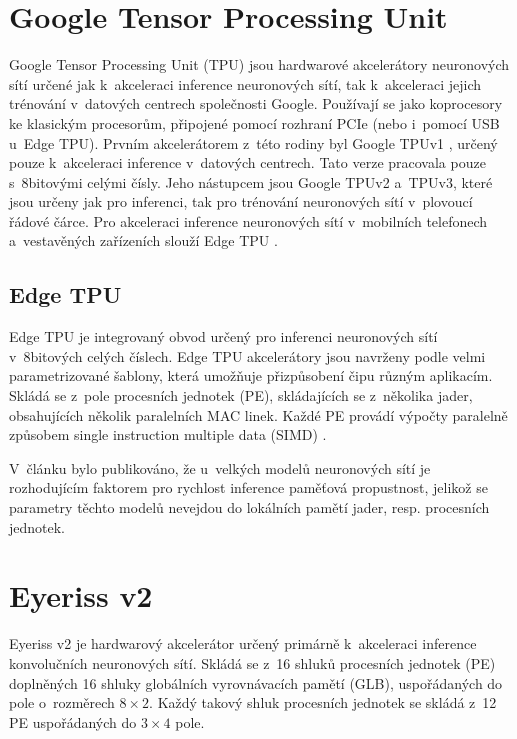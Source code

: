 \section{Google Tensor Processing Unit}

Google Tensor Processing Unit (TPU) jsou hardwarové akcelerátory neuronových sítí určené jak k~akceleraci inference neuronových sítí, tak k~akceleraci jejich trénování v~datových centrech společnosti Google. Používají se jako koprocesory ke klasickým procesorům, připojené pomocí rozhraní PCIe (nebo i~pomocí USB u~Edge TPU). Prvním akcelerátorem z~této rodiny byl Google TPUv1 \cite{9975395}, určený pouze k~akceleraci inference v~datových centrech. Tato verze pracovala pouze s~8bitovými celými čísly. Jeho nástupcem jsou Google TPUv2 a~TPUv3, které jsou určeny jak pro inferenci, tak pro trénování neuronových sítí v~plovoucí řádové čárce. Pro akceleraci inference neuronových sítí v~mobilních telefonech a~vestavěných zařízeních slouží Edge TPU \cite{edge-tpu-website}.

\subsection{Edge TPU}

Edge TPU je integrovaný obvod určený pro inferenci neuronových sítí v~8bitových celých číslech. Edge TPU akcelerátory jsou navrženy podle velmi parametrizované šablony, která umožňuje přizpůsobení čipu různým aplikacím. Skládá se z~pole procesních jednotek (PE), skládajících se z~několika jader, obsahujících několik paralelních MAC linek. Každé PE provádí výpočty paralelně způsobem single instruction multiple data (SIMD) \cite{9975395}. 

V~článku \cite{9975395} bylo publikováno, že u~velkých modelů neuronových sítí je rozhodujícím faktorem pro rychlost inference paměťová propustnost, jelikož se parametry těchto modelů nevejdou do lokálních pamětí jader, resp. procesních jednotek.

\section{Eyeriss v2}

Eyeriss v2 \cite{8686088} je hardwarový akcelerátor určený primárně k~akceleraci inference konvolučních neuronových sítí. Skládá se z~16 shluků procesních jednotek (PE) doplněných 16 shluky globálních vyrovnávacích pamětí (GLB), uspořádaných do pole o~rozměrech $8 \times 2$. Každý takový shluk procesních jednotek se skládá z~12 PE uspořádaných do $3 \times 4$ pole.

